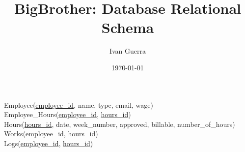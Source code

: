 \documentclass[12pt]{article}
\begin{document}
\title{BigBrother: Database Relational Schema} \author{Ivan
  Guerra} \date{\today}
\maketitle

\noindent
Employee(\underline{employee\_id}, name, type, email, wage)~\\
Employee\_Hours(\underline{employee\_id}, \underline{hours\_id})~\\
Hours(\underline{hours\_id}, date, week\_number, approved, billable, number\_of\_hours)~\\
Works(\underline{employee\_id}, \underline{hours\_id})~\\
Logs(\underline{employee\_id}, \underline{hours\_id})
\end{document}
